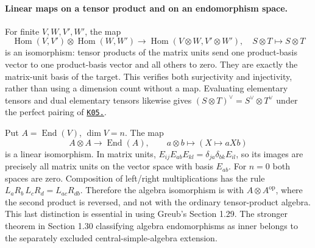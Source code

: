 \documentclass[11pt,a4paper]{book}
\theoremstyle{definition}\newtheorem{definition}[theorem]{Definition}
\theoremstyle{remark}\newtheorem{remark}[theorem]{Remark}
\DeclareMathOperator{\Hom}{Hom}\DeclareMathOperator{\End}{End}
\newcommand{\kref}[1]{\hyperref[k:#1]{\texttt{K05.\detokenize{#1}}}}
\begin{document}
\paragraph{Linear maps on a tensor product and on an endomorphism space.}
For finite $V,W,V',W'$, the map
\[
 \Hom(V,V')\otimes\Hom(W,W')\longrightarrow\Hom(V\otimes W,V'\otimes W'),
 \quad S\otimes T\longmapsto S\otimes T
\]
 is an isomorphism: tensor products of the matrix units send one product-basis vector to one product-basis vector and all others to zero. They are exactly the matrix-unit basis of the target. This verifies both surjectivity and injectivity, rather than using a dimension count without a map. Evaluating elementary tensors and dual elementary tensors likewise gives $(S\otimes T)^\vee=S^\vee\otimes T^\vee$ under the perfect pairing of \kref{15.tensor_pairing}.

Put $A=\End(V)$, $\dim V=n$. The map
\[
 A\otimes A\longrightarrow\End(A),\qquad a\otimes b\longmapsto(X\mapsto aXb)
\]
 is a linear isomorphism. In matrix units,
$E_{ij}E_{ab}E_{kl}=\delta_{ja}\delta_{bk}E_{il}$, so its images are precisely all matrix units on the vector space with basis $E_{ab}$. For $n=0$ both spaces are zero. Composition of left/right multiplications has the rule
$L_aR_b\,L_cR_d=L_{ac}R_{db}$. Therefore the algebra isomorphism is with $A\otimes A^{\mathrm{op}}$, where the second product is reversed, and not with the ordinary tensor-product algebra. This last distinction is essential in using Greub's Section 1.29. The stronger theorem in Section 1.30 classifying algebra endomorphisms as inner belongs to the separately excluded central-simple-algebra extension.
\end{document}
